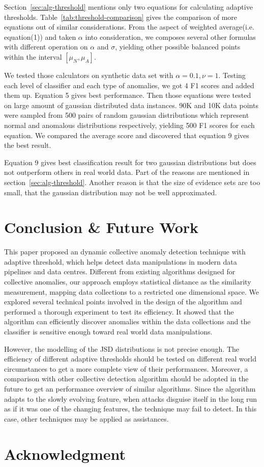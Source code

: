 \documentclass[10pt,conference,letterpaper]{IEEEtran}
\begin{document}
			Section~\ref{sec:alg-threshold} mentions only two equations for calculating adaptive thresholds. Table~\ref{tab:threshold-comparison} gives the comparison of more equations out of similar considerations. From the aspect of weighted average(i.e. equation(1)) and taken $\alpha$ into consideration, we composes several other formulas with different operation on $\alpha$ and $\sigma$, yielding other possible balanced points within the interval $[\mu_N, \mu_A]$.
			
			We tested those calculators on synthetic data set with $\alpha = 0.1, \nu = 1$. Testing each level of classifier and each type of anomalies, we got 4 F1 scores and added them up. Equation 5 gives best performance. Then those equations were tested on large amount of gaussian distributed data instances. 90K and 10K data points were sampled from 500 pairs of random gaussian distributions which represent normal and anomalous distributions respectively, yielding 500 F1 scores for each equation. We compared the average score and discovered that equation 9 gives the best result.
	
			Equation 9 gives best classification result for two gaussian distributions but does not outperform others in real world data. Part of the reasons are mentioned in section~\ref{sec:alg-threshold}. Another reason is that the size of evidence sets are too small, that the gaussian distribution may not be well approximated.
	
			
	\section{Conclusion \& Future Work}\label{sec:conclusion}
		This paper proposed an dynamic collective anomaly detection technique with adaptive threshold, which helps detect data manipulations in modern data pipelines and data centres. Different from existing algorithms designed for collective anomalies, our approach employs statistical distance as the similarity measurement, mapping data collections to a restricted one dimensional space. We explored several technical points involved in the design of the algorithm and performed a thorough experiment to test its efficiency. It showed that the algorithm can efficiently discover anomalies within the data collections and the classifier is sensitive enough toward real world data manipulations.
		
		However, the modelling of the JSD distributions is not precise enough. The efficiency of different adaptive thresholds should be tested on different real world circumstances to get a more complete view of their performances. Moreover, a comparison with other collective detection algorithm should be adopted in the future to get an performance overview of similar algorithms. Since the algorithm adapts to the slowly evolving feature, when attacks disguise itself in the long run as if it was one of the changing features, the technique may fail to detect. In this case, other techniques may be applied as assistances.
		

\section*{Acknowledgment}





\end{document}
